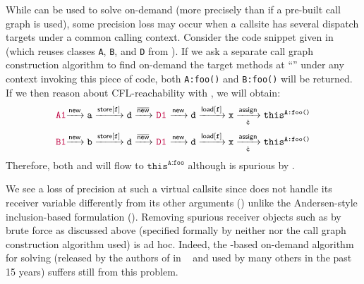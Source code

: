 While \manuLFC can be used to solve  on-demand (more precisely than if 
a pre-built call graph is used), some precision loss may occur
when a callsite has several dispatch targets under a common calling context. Consider the  
 code snippet given in  (which reuses classes \texttt{A}, \texttt{B}, and \texttt{D} from ).
If we ask a separate call graph construction algorithm to find on-demand the  
target methods  at ``''
under any context invoking this piece of code,  both
 \texttt{A:foo()} and \texttt{B:foo()} will be returned. If we then reason about
 CFL-reachability 
with \manuLFC, we will obtain:
{
\setlength{\abovedisplayskip}{3ex}
\begin{equation} 
  \centering
\label{eq:LFCPathCGOnFlyI}
\begin{tabular}{l} 
\commentfont{A1}$\xrightarrow{\new} \texttt{a} \xrightarrow{\store[\texttt{f}]} \texttt{d}
\xrightarrow{\inew}$ \commentfont{D1} 
$ \xrightarrow{\new} \texttt{d}
\xrightarrow{\load[\texttt{f}]} \texttt{x}
\xrightarrow[\hat{\mathtt{c}}]{\assign} \mathtt{this}^{\texttt{A:foo()}}$
\end{tabular}
\end{equation}
}
{
\setlength{\belowdisplayskip}{6ex}
\begin{equation} 
  \centering
\label{eq:LFCPathCGOnFlyII}
\begin{tabular}{l} 
\commentfont{B1}$\xrightarrow{\new} \texttt{b} \xrightarrow{\store[\texttt{f}]} \texttt{d}
\xrightarrow{\overline{\new}}$ \commentfont{D1} 
$ \xrightarrow{\new} \texttt{d}
\xrightarrow{\load[\texttt{f}]} \texttt{x}
\xrightarrow[\hat{\mathtt{c}}]{\assign} \mathtt{this}^{\texttt{A:foo()}}$
\end{tabular}
\end{equation}
}
Therefore,
both  and  will flow to 
$\texttt{this}^{\texttt{A:foo}}$ although  is spurious by .

We see a loss of   precision at such a virtual callsite since \manuLFC does not handle
its receiver variable differently from its other arguments () unlike the Andersen-style inclusion-based formulation
 (). 
 Removing  spurious receiver objects such as  by brute force as discussed above
(specified formally by 
 neither \manuLFC nor the call graph construction algorithm used) is
ad hoc.
Indeed, the \manuLFC-based on-demand algorithm for solving  
(released 
by the authors of \manuLFC \cite{sridharan2006refinement} in \soot~\cite{vallee2010soot} and used by many others
 \cite{xu2009scaling, shang2012demand} in the past 15 years) suffers still from this
problem.


